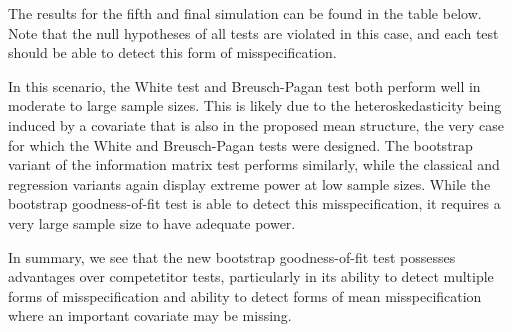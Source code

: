 \documentclass[12pt]{article} %
\theoremstyle{definition}
\begin{document}
The results for the fifth and final simulation can be found in the table below. Note that the null hypotheses of all tests are violated in this case, and each test should be able to detect this form of misspecification.

\begin{table}[H]
	\centering
	\small\addtolength{\tabcolsep}{-3pt}
	\setlength\extrarowheight{-3pt}
	{
	}
	\end{table}

In this scenario, the White test and Breusch-Pagan test both perform well in moderate to large sample sizes. This is likely due to the heteroskedasticity being induced by a covariate that is also in the 
proposed mean structure, the very case for which the White and Breusch-Pagan tests were designed. The bootstrap variant of the information matrix test performs similarly, while the classical and regression
variants again display extreme power at low sample sizes. While the bootstrap goodness-of-fit test is able to detect this misspecification, it requires a very large sample size to have adequate power.

In summary, we see that the new bootstrap goodness-of-fit test possesses advantages over competetitor tests, particularly in its ability to detect multiple forms of misspecification and ability to detect
forms of mean misspecification where an important covariate may be missing.


\end{document}
